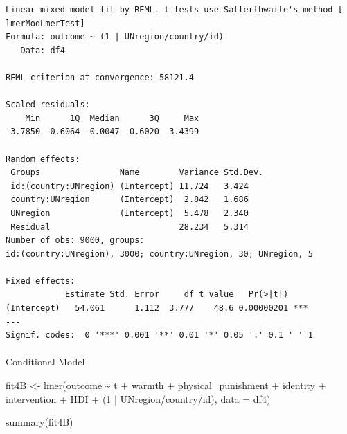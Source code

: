 \documentclass[
  letterpaper,
  DIV=11,
  numbers=noendperiod]{scrreprt}
\makeatletter
\let\oldparagraph\paragraph
\renewcommand{\paragraph}{
    \@ifstar
      \xxxParagraphStar
      \xxxParagraphNoStar
  }
\newcommand{\xxxParagraphStar}[1]{\oldparagraph*{#1}\mbox{}}
\newcommand{\xxxParagraphNoStar}[1]{\oldparagraph{#1}\mbox{}}
\newenvironment{Shaded}{\begin{snugshade}}{\end{snugshade}}
\newcommand{\AttributeTok}[1]{\textcolor[rgb]{0.40,0.45,0.13}{#1}}
\newcommand{\DecValTok}[1]{\textcolor[rgb]{0.68,0.00,0.00}{#1}}
\newcommand{\FunctionTok}[1]{\textcolor[rgb]{0.28,0.35,0.67}{#1}}
\newcommand{\NormalTok}[1]{\textcolor[rgb]{0.00,0.23,0.31}{#1}}
\newcommand{\OtherTok}[1]{\textcolor[rgb]{0.00,0.23,0.31}{#1}}
\newcommand{\SpecialCharTok}[1]{\textcolor[rgb]{0.37,0.37,0.37}{#1}}
\makeatother
\begin{document}
\begin{verbatim}
Linear mixed model fit by REML. t-tests use Satterthwaite's method [
lmerModLmerTest]
Formula: outcome ~ (1 | UNregion/country/id)
   Data: df4

REML criterion at convergence: 58121.4

Scaled residuals: 
    Min      1Q  Median      3Q     Max 
-3.7850 -0.6064 -0.0047  0.6020  3.4399 

Random effects:
 Groups                Name        Variance Std.Dev.
 id:(country:UNregion) (Intercept) 11.724   3.424   
 country:UNregion      (Intercept)  2.842   1.686   
 UNregion              (Intercept)  5.478   2.340   
 Residual                          28.234   5.314   
Number of obs: 9000, groups:  
id:(country:UNregion), 3000; country:UNregion, 30; UNregion, 5

Fixed effects:
            Estimate Std. Error     df t value   Pr(>|t|)    
(Intercept)   54.061      1.112  3.777    48.6 0.00000201 ***
---
Signif. codes:  0 '***' 0.001 '**' 0.01 '*' 0.05 '.' 0.1 ' ' 1
\end{verbatim}

\paragraph{Conditional Model}\label{conditional-model-1}

\begin{Shaded}
\begin{Highlighting}[]
\NormalTok{fit4B }\OtherTok{\textless{}{-}} \FunctionTok{lmer}\NormalTok{(outcome }\SpecialCharTok{\textasciitilde{}}\NormalTok{ t }\SpecialCharTok{+}\NormalTok{ warmth }\SpecialCharTok{+}\NormalTok{ physical\_punishment }\SpecialCharTok{+} 
\NormalTok{                identity }\SpecialCharTok{+}\NormalTok{ intervention }\SpecialCharTok{+}\NormalTok{ HDI }\SpecialCharTok{+} 
\NormalTok{                (}\DecValTok{1} \SpecialCharTok{|}\NormalTok{ UNregion}\SpecialCharTok{/}\NormalTok{country}\SpecialCharTok{/}\NormalTok{id),}
              \AttributeTok{data =}\NormalTok{ df4)}

\FunctionTok{summary}\NormalTok{(fit4B)}
\end{Highlighting}
\end{Shaded}
\end{document}
